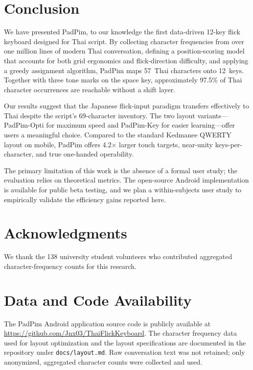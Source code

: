 \documentclass[10pt,twocolumn,a4paper]{article}
\begin{document}
\section{Conclusion}
\label{sec:conclusion}

We have presented PadPim, to our knowledge the first data-driven 12-key flick keyboard designed for Thai script.
By collecting character frequencies from over one million lines of modern Thai conversation, defining a position-scoring model that accounts for both grid ergonomics and flick-direction difficulty, and applying a greedy assignment algorithm, PadPim maps 57~Thai characters onto 12~keys.
Together with three tone marks on the space key, approximately 97.5\% of Thai character occurrences are reachable without a shift layer.

Our results suggest that the Japanese flick-input paradigm transfers effectively to Thai despite the script's 69-character inventory.
The two layout variants---PadPim-Opti for maximum speed and PadPim-Key for easier learning---offer users a meaningful choice.
Compared to the standard Kedmanee QWERTY layout on mobile, PadPim offers 4.2$\times$ larger touch targets, near-unity keys-per-character, and true one-handed operability.

The primary limitation of this work is the absence of a formal user study; the evaluation relies on theoretical metrics.
The open-source Android implementation is available for public beta testing, and we plan a within-subjects user study to empirically validate the efficiency gains reported here.

\section*{Acknowledgments}

We thank the 138 university student volunteers who contributed aggregated character-frequency counts for this research.

\section*{Data and Code Availability}

The PadPim Android application source code is publicly available at \url{https://github.com/Jnx03/ThaiFlickKeyboard}.
The character frequency data used for layout optimization and the layout specifications are documented in the repository under \texttt{docs/layout.md}.
Raw conversation text was not retained; only anonymized, aggregated character counts were collected and used.

\balance


\end{document}
